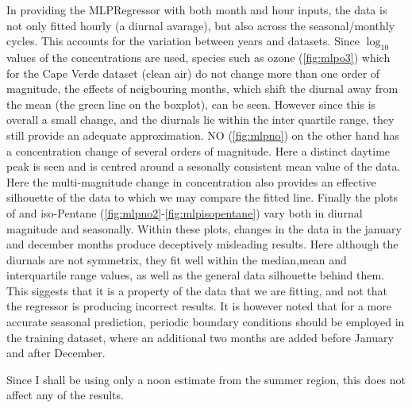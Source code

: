 In providing the MLPRegressor with both month and hour inputs, the data is not only fitted hourly (a diurnal avarage), but also across the seasonal/monthly cycles. This accounts for the variation between years and datasets. Since $\log_{10}$ values of the concentrations are used, species such as ozone (\autoref{fig:mlpo3}) which for the Cape Verde dataset (clean air) do not change more than one order of magnitude, the effects of neigbouring months, which shift the diurnal away from the mean (the green line on the boxplot), can be seen. However since this is overall a small change, and the diurnals lie within the inter quartile range, they still provide an adequate approximation. NO (\autoref{fig:mlpno}) on the other hand has a concentration change of several orders of magnitude. Here a distinct daytime peak is seen and is centred around a sesonally consistent mean value of the data. Here the multi-magnitude change in concentration also provides an effective silhouette of the data to which we may compare the fitted line. 
Finally the plots of  and iso-Pentane (\autoref{fig:mlpno2}-\ref{fig:mlpisopentane}) vary both in diurnal magnitude and seasonally. Within these plots, changes in the data in the january and december months produce deceptively misleading results. Here although the diurnals are not symmetrix, they fit well within the median,mean and interquartile range values, as well as the general data silhouette behind them. This siggests that it is a property of the data that we are fitting, and not that the regressor is producing incorrect results. It is however noted that for a more accurate seasonal prediction, periodic boundary conditions should be employed in the training dataset, where an additional two months are added before January and after December. 

Since I shall be using only a noon estimate from the summer region, this does not affect any of the results. 

